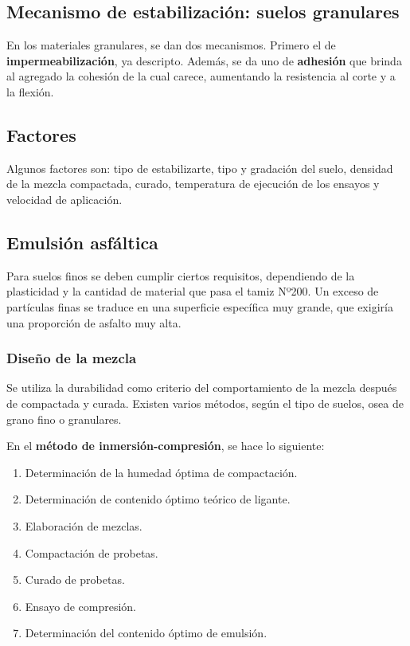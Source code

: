 \documentclass[../main.tex]{subfiles}
\begin{document}
\subsection{Mecanismo de estabilización: suelos granulares}

En los materiales granulares, se dan dos mecanismos. Primero el de 
\textbf{impermeabilización}, ya descripto. Además, se da uno de 
\textbf{adhesión} que brinda al agregado la cohesión de la cual carece, 
aumentando la resistencia al corte y a la flexión.

\subsection{Factores}

Algunos factores son: tipo de estabilizarte, tipo y gradación del suelo,
densidad de la mezcla compactada, curado, temperatura de ejecución de los
ensayos y velocidad de aplicación.

\subsection{Emulsión asfáltica}

Para suelos finos se deben cumplir ciertos requisitos, dependiendo de la
plasticidad y la cantidad de material que pasa el tamiz Nº200. Un exceso
de partículas finas se traduce en una superficie específica muy grande, que 
exigiría una proporción de asfalto muy alta.

\subsubsection{Diseño de la mezcla}

Se utiliza la durabilidad como criterio del comportamiento de la mezcla después
de compactada y curada. Existen varios métodos, según el tipo de suelos,
osea de grano fino o granulares.

En el \textbf{método de inmersión-compresión}, se hace lo siguiente:

\begin{enumerate}
  \item Determinación de la humedad óptima de compactación.
  \item Determinación de contenido óptimo teórico de ligante.
  \item Elaboración de mezclas.
  \item Compactación de probetas.
  \item Curado de probetas.
  \item Ensayo de compresión.
  \item Determinación del contenido óptimo de emulsión.
\end{enumerate}
\end{document}
